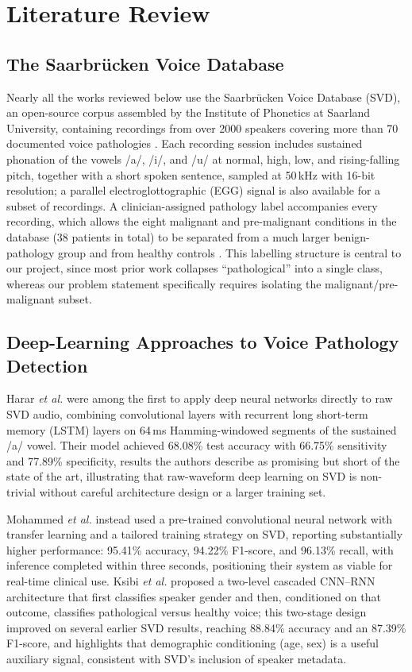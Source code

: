 \documentclass[conference]{IEEEtran}
\begin{document}
\section{Literature Review}
\label{sec:litreview}

\subsection{The Saarbr\"ucken Voice Database}
Nearly all the works reviewed below use the Saarbr\"ucken Voice Database (SVD), an open-source corpus assembled by the Institute of Phonetics at Saarland University, containing recordings from over 2000 speakers covering more than 70 documented voice pathologies \cite{harar2017}. Each recording session includes sustained phonation of the vowels /a/, /i/, and /u/ at normal, high, low, and rising-falling pitch, together with a short spoken sentence, sampled at 50\,kHz with 16-bit resolution; a parallel electroglottographic (EGG) signal is also available for a subset of recordings. A clinician-assigned pathology label accompanies every recording, which allows the eight malignant and pre-malignant conditions in the database (38 patients in total) to be separated from a much larger benign-pathology group and from healthy controls \cite{paterson2024}. This labelling structure is central to our project, since most prior work collapses ``pathological'' into a single class, whereas our problem statement specifically requires isolating the malignant/pre-malignant subset.

\subsection{Deep-Learning Approaches to Voice Pathology Detection}
Harar \emph{et al.} \cite{harar2017} were among the first to apply deep neural networks directly to raw SVD audio, combining convolutional layers with recurrent long short-term memory (LSTM) layers on 64\,ms Hamming-windowed segments of the sustained /a/ vowel. Their model achieved 68.08\% test accuracy with 66.75\% sensitivity and 77.89\% specificity, results the authors describe as promising but short of the state of the art, illustrating that raw-waveform deep learning on SVD is non-trivial without careful architecture design or a larger training set.

Mohammed \emph{et al.} \cite{mohammed2020} instead used a pre-trained convolutional neural network with transfer learning and a tailored training strategy on SVD, reporting substantially higher performance: 95.41\% accuracy, 94.22\% F1-score, and 96.13\% recall, with inference completed within three seconds, positioning their system as viable for real-time clinical use. Ksibi \emph{et al.} \cite{ksibi2023} proposed a two-level cascaded CNN--RNN architecture that first classifies speaker gender and then, conditioned on that outcome, classifies pathological versus healthy voice; this two-stage design improved on several earlier SVD results, reaching 88.84\% accuracy and an 87.39\% F1-score, and highlights that demographic conditioning (age, sex) is a useful auxiliary signal, consistent with SVD's inclusion of speaker metadata.
\end{document}
